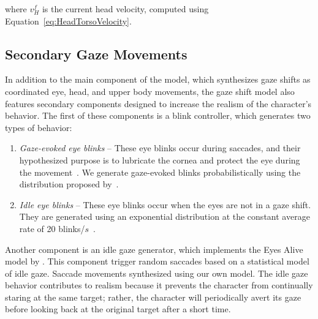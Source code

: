 where $v^f_H$ is the current head velocity, computed using Equation~\ref{eq:HeadTorsoVelocity}.

\subsection{Secondary Gaze Movements}
\label{sec:GazeShiftSecondary}

In addition to the main component of the model, which synthesizes gaze shifts as coordinated eye, head, and upper body movements, the gaze shift model also features secondary components designed to increase the realism of the character's behavior. The first of these components is a blink controller, which generates two types of behavior:

\begin{enumerate}
\item \emph{Gaze-evoked eye blinks} -- These eye blinks occur during saccades, and their hypothesized purpose is to lubricate the cornea and protect the eye during the movement~\citep{evinger1994lookleap}. We generate gaze-evoked blinks probabilistically using the distribution proposed by~\citet{peters2010animating}.
\item \emph{Idle eye blinks} -- These eye blinks occur when the eyes are not in a gaze shift. They are generated using an exponential distribution at the constant average rate of 20 blinks/$s$~\citep{bentivoglio1997blinkrate}.
\end{enumerate}

Another component is an idle gaze generator, which implements the Eyes Alive model by \citet{lee2002eyes}. This component trigger random saccades based on a statistical model of idle gaze. Saccade movements synthesized using our own model. The idle gaze behavior contributes to realism because it prevents the character from continually staring at the same target; rather, the character will periodically avert its gaze before looking back at the original target after a short time. 